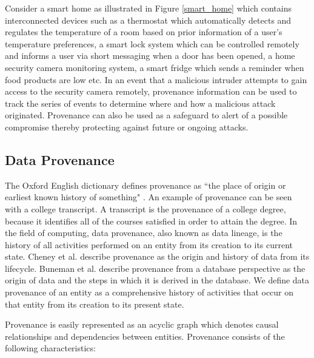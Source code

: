 \documentclass[conference]{IEEEtran}
\begin{document}
Consider a smart home as illustrated in Figure \ref{smart_home} which contains interconnected devices such as a thermostat which automatically detects and regulates the temperature of a room based on prior information of a user's temperature preferences, a smart lock system which can be controlled remotely and informs a user via short messaging when a door has been opened, a home security camera monitoring system, a smart fridge which sends a reminder when food products are low etc. In an event that a malicious intruder attempts  to gain access to the security camera remotely, provenance information can be used to track the series  of events to determine where and how a malicious attack originated. Provenance can also be used as a safeguard to alert of a possible  compromise thereby protecting against future or ongoing attacks. 



\subsection{Data Provenance}

The Oxford English dictionary defines provenance as ``the place of origin or earliest
known history of something" \cite{TCDP1999}. An example of provenance can be seen with a college transcript. A transcript is the provenance of a college degree, because it identifies all of the
courses satisfied in order to attain the degree. In the field of computing, data provenance, also known as data lineage, is the history of all activities performed on an entity from its creation to its current state.
Cheney et al. \cite{cheney_provenance_2009}  describe provenance as the origin and history of data from its lifecycle. Buneman et al. \cite{buneman_why_2001} describe provenance from a database perspective as the origin of data and the steps in which it is derived in the database. We define data provenance of an entity as a comprehensive history of activities that occur on that entity from its creation to its present state.


Provenance is easily represented as an acyclic graph which denotes causal relationships and dependencies between entities. Provenance consists of the following characteristics:
 
\end{document}
